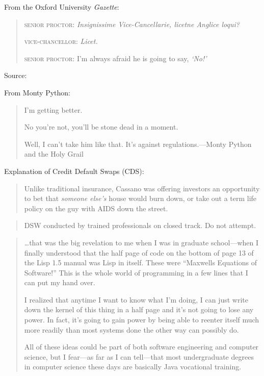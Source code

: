 \documentclass[a4paper]{article}
\begin{document}
\medskip
From the Oxford University \emph{Gazette}:
\begin{quote}
	\textsc{senior proctor}: \emph{Insignissime Vice-Cancellarie, licetne Anglice loqui?}

	\textsc{vice-chancellor}: \emph{Licet.}

	\textsc{senior proctor}: I'm always afraid he is going to say,
	\emph{`No!'}
\end{quote}
Source: \citep{Fraser2009a}

\medskip
From Monty Python:
\begin{quote}
	I'm getting better.

	No you're not, you'll be stone dead in a moment.

	Well, I can't take him like that. It's against
	regulations.---Monty Python and the Holy Grail
\end{quote}

\medskip
Explanation of Credit Default Swaps (CDS):
\begin{quote}
	Unlike traditional insurance, Cassano was offering investors an
	opportunity to bet that \emph{someone else's} house would burn
	down, or take out a term life policy on the guy with AIDS down
	the street.~\citep{Taibbi2009a}
\end{quote}

\medskip
\begin{quote}
	DSW conducted by trained professionals on closed track.  Do not
	attempt.
\end{quote}

\medskip
\begin{quote}
	\ldots that was the big revelation to me when I was in graduate
	school---when I finally understood that the half page of code on the
	bottom of page 13 of the Lisp 1.5 manual was Lisp in itself. These
	were ``Maxwells Equations of Software!'' This is the whole world of
	programming in a few lines that I can put my hand over.

	I realized that anytime I want to know what I'm doing, I can just
	write down the kernel of this thing in a half page and it's not
	going to lose any power. In fact, it's going to gain power by
	being able to reenter itself much more readily than most systems
	done the other way can possibly do.

	All of these ideas could be part of both software engineering
	and computer science, but I fear---as far as I can tell---that most
	undergraduate degrees in computer science these days are basically
	Java vocational training.~\citep{Feldman2004a}
\end{quote}
\end{document}
